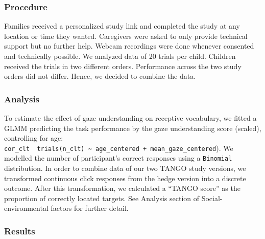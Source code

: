 \documentclass[
  man,floatsintext]{apa6}
\begin{document}
\hypertarget{procedure}{%
\subsubsection{Procedure}\label{procedure}}

Families received a personalized study link and completed the study at any location or time they wanted. Caregivers were asked to only provide technical support but no further help. Webcam recordings were done whenever consented and technically possible. We analyzed data of 20 trials per child. Children received the trials in two different orders. Performance across the two study orders did not differ. Hence, we decided to combine the data.

\hypertarget{analysis-1}{%
\subsubsection{Analysis}\label{analysis-1}}

To estimate the effect of gaze understanding on receptive vocabulary, we fitted a GLMM predicting the task performance by the gaze understanding score (scaled), controlling for age: \texttt{cor\_clt\ \textbar{}\ trials(n\_clt)\ \textasciitilde{}\ age\_centered\ +\ mean\_gaze\_centered}). We modelled the number of participant's correct responses using a \texttt{Binomial} distribution.
In order to combine data of our two TANGO study versions, we transformed continuous click responses from the hedge version into a discrete outcome. After this transformation, we calculated a ``TANGO score'' as the proportion of correctly located targets. See Analysis section of Social-environmental factors for further detail.

\hypertarget{results-1}{%
\subsubsection{Results}\label{results-1}}

\begin{table}[H]
\centering
{}
\end{table}
\end{document}
